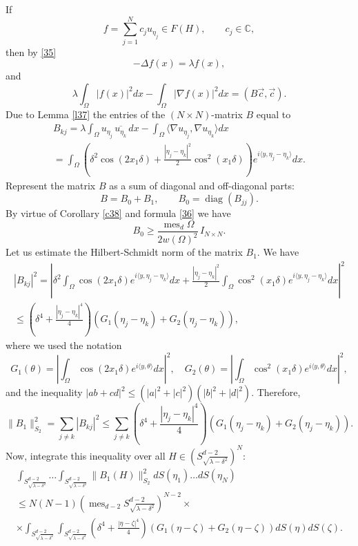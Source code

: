 \documentclass[a4paper,12pt]{article}
\numberwithin{equation}{section}
\def \de{\delta}
\def \ze{\zeta}
\def \la{\lambda}
\def \te{\theta}
\def \D{\Delta}
\def \O{\Omega}
\def \C{\mathbb{C}}
\def\n{\nabla}
\def\mes{\operatorname{mes}}
\newcommand{\<}{\langle}
\renewcommand{\>}{\rangle}
\theoremstyle{plain}
\theoremstyle{definition}
\theoremstyle{remark}
\renewcommand{\le}{\leqslant}
\renewcommand{\ge}{\geqslant}
\begin{document}
If 
$$
f = \sum_{j=1}^N c_j u_{\eta_j} \in F (H), \qquad c_j \in \C,
$$
then by \eqref{35}
$$
- \D f(x) = \la f(x),
$$
and
$$
\la \int_\O |f(x)|^2 dx - \int_\O |\n f(x)|^2 dx = (B \vec c, \vec c).
$$
Due to Lemma \ref{l37} the entries of the $(N\times N)$-matrix $B$ equal to
\begin{eqnarray*}
B_{kj} =
\la \int_\O u_{\eta_j}\, \overline{u_{\eta_k}}\, dx 
- \int_\O \<\n u_{\eta_j}, \n u_{\eta_k}\> dx \\
= \int_\O \left(\de^2 \cos(2x_1\de) + \frac{|\eta_j-\eta_k|^2}2 \cos^2 (x_1\de)\right)
e^{i\<y, \eta_j-\eta_k\>} dx.
\end{eqnarray*}
Represent the matrix $B$ as a sum of diagonal and off-diagonal parts:
$$
B = B_0 + B_1, \qquad B_0 = \operatorname{diag} (B_{jj}).
$$
By virtue of Corollary \ref{c38} and formula \eqref{36} we have
\begin{equation}
\label{38}
B_0 \ge \frac{\mes_d \O}{2 w(\O)^2}\, I_{N\times N}.
\end{equation}
Let us estimate the Hilbert-Schmidt norm of the matrix $B_1$.
We have
\begin{eqnarray*}
|B_{kj}|^2 
= \left|\de^2 \int_\O \cos(2x_1\de) e^{i\<y, \eta_j-\eta_k\>} dx
+ \frac{|\eta_j-\eta_k|^2}2 \int_\O \cos^2 (x_1\de) e^{i\<y, \eta_j-\eta_k\>} dx\right|^2 \\
\le \left(\de^4 + \frac{|\eta_j-\eta_k|^4}4\right)
\left(G_1 (\eta_j-\eta_k) + G_2 (\eta_j-\eta_k)\right),
\end{eqnarray*}
where we used the notation
\begin{equation}
\label{39}
G_1 (\te) = \left|\int_\O \cos(2x_1\de) e^{i\<y,\te\>} dx\right|^2, \quad
G_2 (\te) = \left|\int_\O \cos^2 (x_1\de) e^{i\<y,\te\>} dx\right|^2,
\end{equation}
and the inequality $|ab+cd|^2 \le (|a|^2+|c|^2) (|b|^2 + |d|^2)$.
Therefore,
$$
\|B_1\|_{S_2}^2 = \sum_{j\neq k} |B_{kj}|^2
\le \sum_{j \neq k} \left(\de^4 + \frac{|\eta_j-\eta_k|^4}4\right)
\left(G_1 (\eta_j-\eta_k) + G_2 (\eta_j-\eta_k)\right).
$$
Now, integrate this inequality over all $H \in \left(S_{\sqrt{\la-\de^2}}^{d-2}\right)^N$:
\begin{eqnarray}
\nonumber
\int_{S_{\sqrt{\la-\de^2}}^{d-2}} \dots \int_{S_{\sqrt{\la-\de^2}}^{d-2}} 
\|B_1 (H)\|_{S_2}^2 dS (\eta_1) \dots dS (\eta_N) \\
\label{310}
\le N (N-1) \left(\mes_{d-2} S_{\sqrt{\la-\de^2}}^{d-2}\right)^{N-2} \times \\
\times \int_{S_{\sqrt{\la-\de^2}}^{d-2}} \int_{S_{\sqrt{\la-\de^2}}^{d-2}}
\left(\de^4 + \frac{|\eta-\ze|^4}4\right)
\left(G_1 (\eta-\ze) + G_2 (\eta-\ze)\right) dS (\eta) dS(\ze).
\nonumber
\end{eqnarray}
\end{document}
